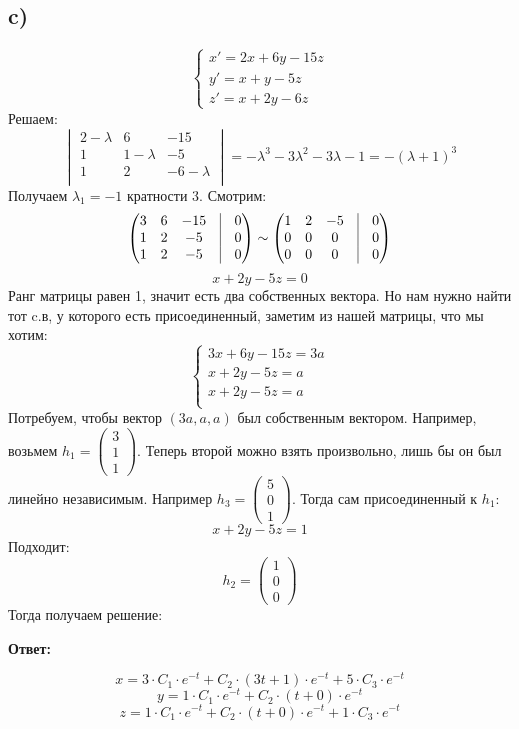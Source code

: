 \documentclass[a4paper,12pt]{article}
\begin{document}
\subsection*{c)}
\[
\begin{cases}
x' = 2x + 6y - 15z \\
y' = x + y - 5z \\
z' = x + 2y -6z
\end{cases}
\]
Решаем:
\[
\begin{vmatrix}
2 - \lambda & 6 & -15 \\
1 & 1  - \lambda & -5 \\
1 & 2 & - 6  - \lambda \\
\end{vmatrix} = -\lambda^3 -3\lambda^2 -3\lambda - 1 = -(\lambda + 1)^3
\]
Получаем $\lambda_{1} = -1$ кратности 3. Смотрим:
\[
\begin{pmatrix}
3 & 6 & -15 & \vrule & 0 \\
1 & 2 & -5  & \vrule & 0 \\
1 & 2 & -5 & \vrule & 0 \\
\end{pmatrix} \sim 
\begin{pmatrix}
1 & 2 & -5 & \vrule & 0 \\
0& 0& 0 & \vrule & 0 \\
0& 0 & 0 & \vrule & 0 \\
\end{pmatrix} 
\]
\[
 x + 2y - 5z = 0
\]
Ранг матрицы равен 1, значит есть два собственных вектора. Но нам нужно найти тот c.в, у которого есть присоединенный, заметим из нашей матрицы, что мы хотим:
\[
\begin{cases}
3x + 6y - 15z = 3a \\
x + 2y -5z = a \\
x + 2y - 5z = a\\ 
\end{cases}
\]
Потребуем, чтобы вектор $(3a, a, a)$ был собственным вектором. Например, возьмем $h_1 = \begin{pmatrix}
3 \\ 1 \\ 1
\end{pmatrix}$. Теперь второй можно взять произвольно, лишь бы он был линейно независимым. Например $h_3 = \begin{pmatrix}
5 \\ 0 \\ 1
\end{pmatrix}$. Тогда сам присоединенный к $h_1$:
\[
x + 2y - 5z = 1
\]
Подходит:
\[
h_2
= 
\begin{pmatrix}
1 \\ 0 \\ 0 
\end{pmatrix}
\]
Тогда получаем решение:
\begin{center}
\textbf{Ответ: } 
\end{center}
\[
x = 3 \cdot C_1 \cdot e^{-t} + C_2 \cdot (3t + 1) \cdot e^{-t}+ 5 \cdot C_3 \cdot e^{-t}
\]
\[
y = 1 \cdot C_1 \cdot e^{-t}+ C_2 \cdot (t + 0) \cdot e^{-t} 
\]
\[
z =  1 \cdot C_1 \cdot e^{-t}+ C_2 \cdot (t + 0)  \cdot e^{-t}+  1 \cdot C_3 \cdot e^{-t}
\]
\clearpage
\end{document}
